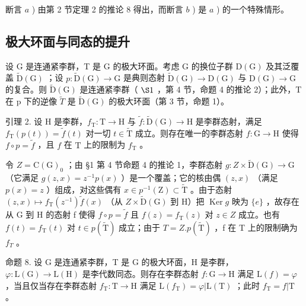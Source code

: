 断言 \(a\) ) 由第 2 节定理 2 的推论 8 得出，而断言 \(b\) ) 是 \(a\) ) 的一个特殊情形。

\subsection{极大环面与同态的提升}

设 G 是连通紧李群，T 是 G 的极大环面。考虑 G 的换位子群 \(\mathrm{D}(\mathrm{G})\) 及其泛覆盖 \(\tilde{\mathrm{D}}(\mathrm{G})\) ；设 \(p: \tilde{\mathrm{D}}(\mathrm{G}) \to \mathrm{G}\) 是典则态射 \(\tilde{\mathrm{D}}(\mathrm{G}) \to \mathrm{D}(\mathrm{G})\) 与 \(\mathrm{D}(\mathrm{G}) \to \mathrm{G}\) 的复合。则 \(\tilde{\mathrm{D}}(\mathrm{G})\) 是连通紧李群（ \(\S1\) ，第 4 节，命题 4 的推论 2）；此外，T 在 p 下的逆像 \(\tilde{T}\) 是 \(\tilde{\mathrm{D}}(\mathrm{G})\) 的极大环面（第 3 节，命题 1）。

引理 2. 设 H 是李群，\(f_{\mathrm{T}}: \mathrm{T} \to \mathrm{H}\) 与 \(\tilde{f}: \tilde{\mathrm{D}}(\mathrm{G}) \to \mathrm{H}\) 是李群态射，满足 \(f_{\mathrm{T}}(p(t)) = \tilde{f}(t)\) 对一切 \(t \in \tilde{\mathrm{T}}\) 成立。则存在唯一的李群态射 \(f: \mathrm{G} \to \mathrm{H}\) 使得 \(f \circ p = \tilde{f}\) ，且 \(f\) 在 \(\mathrm{T}\) 上的限制为 \(f_{\mathrm{T}}\) 。

令 \(Z = \mathrm{C}(\mathrm{G})_{0}\) ；由 §1 第 4 节命题 4 的推论 1，李群态射 \(g: Z \times \tilde{\mathrm{D}}(\mathrm{G}) \to \mathrm{G}\) （它满足 \(g(z, x) = z^{-1} p(x)\) ）是一个覆盖；它的核由偶 \((z, x)\) （满足 \(p(x) = z\) ）组成，对这些偶有 \(x \in p^{-1}(\mathrm{Z}) \subset \tilde{\mathrm{T}}\) 。由于态射 \((z, x) \mapsto f_{\mathrm{T}}(z^{-1}) \tilde{f}(x)\) （从 \(Z \times \tilde{\mathrm{D}}(\mathrm{G})\) 到 H）把 \(\operatorname{Ker} g\) 映为 \(\{e\}\) ，故存在从 G 到 H 的态射 f 使得 \(f \circ p = \tilde{f}\) 且 \(f(z) = f_{\mathrm{T}}(z)\) 对 \(z \in Z\) 成立。也有 \(f(t) = f_{\mathrm{T}}(t)\) 对 \(t \in p(\tilde{\mathrm{T}})\) 成立；由于 \(T = Z.p(\tilde{\mathrm{T}})\) ，f 在 T 上的限制确为 \(f_{T}\) 。

命题 8. 设 G 是连通紧李群，T 是 G 的极大环面，H 是李群，\(\varphi : \mathrm{L}(\mathrm{G}) \to \mathrm{L}(\mathrm{H})\) 是李代数同态。则存在李群态射 \(f: \mathrm{G} \to \mathrm{H}\) 满足 \(\mathrm{L}(f) = \varphi\) ，当且仅当存在李群态射 \(f_{\mathrm{T}}: \mathrm{T} \to \mathrm{H}\) 满足 \(\mathrm{L}(f_{\mathrm{T}}) = \varphi | \mathrm{L}(\mathrm{T})\) ；此时 \(f_{\mathrm{T}} = f | \mathrm{T}\) 。

